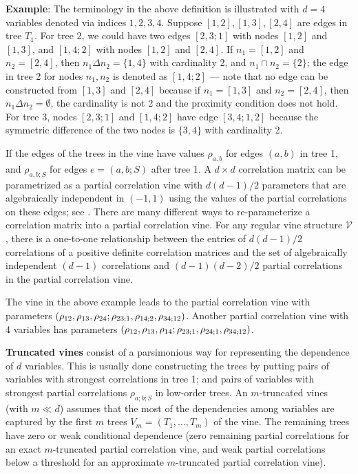 \documentclass[a4paper]{article}
\def\v{\mathcal{V}}
\begin{document}
\noindent \textbf{Example}: 
The terminology in the above definition is illustrated with $d=4$ variables denoted via indices $1,2,3,4$.
Suppose $[1,2], [1,3], [2,4]$ are edges in tree $T_1$.  For tree 2, we
could have two edges $[2,3;1]$ with nodes $[1,2]$ and $[1,3]$, and
$[1,4;2]$ with nodes $[1,2]$ and $[2,4]$.  If $n_1=[1,2]$ and
$n_2=[2,4]$, then $n_1\Delta n_2=\{1,4\}$ with cardinality 2, and
$n_1\cap n_2=\{2\}$; the edge in tree 2 for nodes $n_1,n_2$ is denoted
as $[1,4;2]$ --- note that no edge can be constructed from $[1,3]$ and
$[2,4]$ because if $n_1=[1,3]$ and $n_2=[2,4]$, then
$n_1\Delta n_2=\emptyset$, the cardinality is not 2 and the proximity
condition does not hold.  For tree 3, nodes $[2,3;1]$ and $[1,4;2]$
have edge $[3,4;1,2]$ because the symmetric difference of the two
nodes is $\{3,4\}$ with cardinality 2.


If the edges of the trees in the vine have values $\rho_{a,b}$ for edges $(a, b)$ in tree 1, and $\rho_{a,b;S}$ for edges $e =(a,b;S)$ after tree 1. A $d\times d$ correlation matrix can be parametrized as a partial
correlation vine with $d(d-1)/2$ parameters that are algebraically independent in $(-1,1)$ using
the values of the partial correlations on these edges; see \cite{kurowicka2003parameterization}. There are many different ways to re-parameterize a correlation matrix into a partial correlation vine. For any regular vine structure $\v$, there is a one-to-one relationship between the entries of $d(d-1)/2$ correlations of a positive definite correlation matrices and the set of algebraically independent $(d-1)$ correlations and $(d-1)(d-2)/2$ partial correlations in the partial correlation vine.

The vine in the above example leads to the partial correlation vine with parameters $(\rho_{12}, \rho_{13}, \rho_{24};\\
\rho_{23;1}, \rho_{14;2}, \rho_{34;12})$. Another partial correlation vine with 4 variables has parameters $(\rho_{12}, \rho_{13},\rho_{14};\\
\rho_{23;1}, \rho_{24;1},\rho_{34;12})$.


\textbf{Truncated vines} consist of a parsimonious way for representing the dependence of $d$ variables.  This is usually done constructing the trees by putting pairs of variables with strongest correlations in tree 1; and pairs of variables with strongest partial correlations $\rho_{a;b;S}$ in low-order trees.
An $m$-truncated vines (with $m\ll d$) assumes that the most of the dependencies
among variables are captured by the first $m$ trees $V_{m}=(T_{1},\ldots,T_{m})$ of the vine. The remaining trees have zero or weak conditional dependence (zero remaining partial correlations for an exact $m$-truncated partial correlation vine, and weak partial correlations below a threshold for an approximate $m$-truncated partial correlation vine).\\
\end{document}
